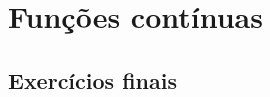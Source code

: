 
\chapter{Funções contínuas}\label{cap:funcoes_continuas}

\emconstrucao

\section{Exercícios finais}

\construirExer